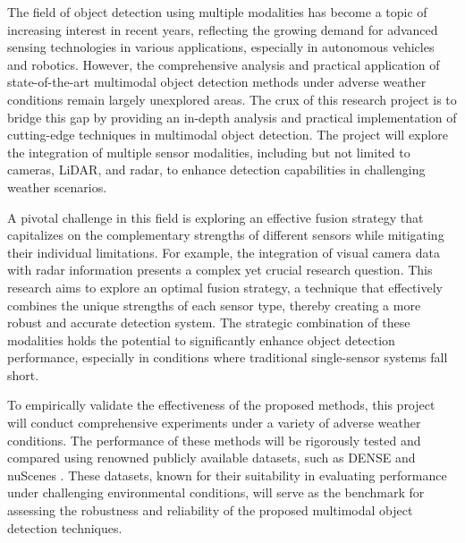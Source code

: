 \documentclass[report.tex]{subfiles}
\begin{document}
      


    The field of object detection using multiple modalities has become a topic of increasing interest in recent years, reflecting the growing demand for advanced sensing technologies in various applications, especially in autonomous vehicles and robotics. However, the comprehensive analysis and practical application of state-of-the-art multimodal object detection methods under adverse weather conditions remain largely unexplored areas. The crux of this research project is to bridge this gap by providing an in-depth analysis and practical implementation of cutting-edge techniques in multimodal object detection. The project will explore the integration of multiple sensor modalities, including but not limited to cameras, LiDAR, and radar, to enhance detection capabilities in challenging weather scenarios.

    A pivotal challenge in this field is exploring an effective fusion strategy that capitalizes on the complementary strengths of different sensors while mitigating their individual limitations. For example, the integration of visual camera data with radar information presents a complex yet crucial research question. This research aims to explore an optimal fusion strategy, a technique that effectively combines the unique strengths of each sensor type, thereby creating a more robust and accurate detection system. The strategic combination of these modalities holds the potential to significantly enhance object detection performance, especially in conditions where traditional single-sensor systems fall short.

    To empirically validate the effectiveness of the proposed methods, this project will conduct comprehensive experiments under a variety of adverse weather conditions. The performance of these methods will be rigorously tested and compared using renowned publicly available datasets, such as DENSE \cite{bijelic2020seeing} and nuScenes \cite{caesar2020nuscenes}. These datasets, known for their suitability in evaluating performance under challenging environmental conditions, will serve as the benchmark for assessing the robustness and reliability of the proposed multimodal object detection techniques.
\end{document}
